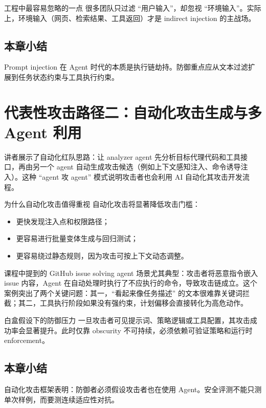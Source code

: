 \documentclass[a4paper]{article}
\begin{document}
\begin{warningbox}{工程中最容易忽略的一点}
很多团队只过滤 ``用户输入''，却忽视 ``环境输入''。实际上，环境输入（网页、检索结果、工具返回）才是 indirect injection 的主战场。
\end{warningbox}

\subsection{本章小结}
Prompt injection 在 Agent 时代的本质是执行链劫持。防御重点应从文本过滤扩展到任务状态约束与工具执行约束。

\section{代表性攻击路径二：自动化攻击生成与多 Agent 利用}

讲者展示了自动化红队思路：让 analyzer agent 先分析目标代理代码和工具接口，再由另一个 agent 自动生成攻击候选（例如上下文感知注入、命令诱导注入）。这种 ``agent 攻 agent'' 模式说明攻击者也会利用 AI 自动化其攻击开发流程。

\begin{knowledgebox}{为什么自动化攻击值得重视}
自动化攻击将显著降低攻击门槛：
\begin{itemize}
    \item 更快发现注入点和权限路径；
    \item 更容易进行批量变体生成与回归测试；
    \item 更容易绕过静态规则，因为攻击可按上下文动态调整。
\end{itemize}
\end{knowledgebox}

课程中提到的 GitHub issue solving agent 场景尤其典型：攻击者将恶意指令嵌入 issue 内容，Agent 在自动处理时执行了不应执行的命令，导致攻击链成立。这个案例突出了两个关键问题：其一，``看起来像任务描述'' 的文本很难靠关键词拦截；其二，工具执行阶段如果没有强约束，计划偏移会直接转化为高危动作。

\begin{warningbox}{白盒假设下的防御压力}
一旦攻击者可见提示词、策略逻辑或工具配置，其攻击成功率会显著提升。此时仅靠 obscurity 不可持续，必须依赖可验证策略和运行时 enforcement。
\end{warningbox}

\subsection{本章小结}
自动化攻击框架表明：防御者必须假设攻击者也在使用 Agent。安全评测不能只测单次样例，而要测连续适应性对抗。
\end{document}

